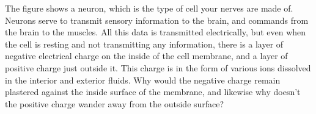         The figure shows a neuron, which is the type of cell your
        nerves are made of.  Neurons serve to transmit sensory
        information to the brain, and commands from the brain to the
        muscles.  All this data is transmitted electrically, but
        even when the cell is resting and not transmitting any
        information, there is a layer of negative electrical charge
        on the inside of the cell membrane, and a layer of positive
        charge just outside it.  This charge is in the form of
        various ions dissolved in the interior and exterior fluids. 
        Why would the negative charge remain plastered against the
        inside surface of the membrane, and likewise why doesn't the
        positive charge wander away from the outside surface?
